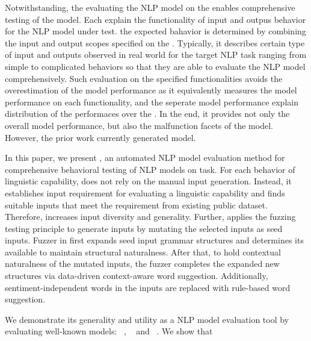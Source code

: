 Notwithstanding, the evaluating the NLP model on the \lcs enables
comprehensive testing of the model. Each \lc explain the functionality
of input and outpus behavior for the NLP model under test. the
expected bahavior is determined by combining the input and output
scopes specified on the \lc. Typically, it describes certain type of
input and outputs observed in real world for the target NLP task
ranging from simple to complicated behaviors so that they are able to
evaluate the NLP model comprehensively. Such evaluation on the
specified functionalities avoids the overestimation of the model
performance as it equivalently measures the model performance on each
functionality, and the seperate model performance explain distribution
of the performaces over the \lcs. In the end, it provides not only the
overall model performance, but also the malfunction facets of the
model. However, the prior work currently generated model.

In this paper, we present \tool, an automated NLP model evaluation
method for comprehensive behavioral testing of NLP models on \sa
task. For each behavior of linguistic capability, \tool does not rely
on the manual input generation. Instead, it establishes input
requirement for evaluating a linguistic capability and finds suitable
inputs that meet the requirement from existing public dataset.
Therefore, \tool increases input diversity and generality. Further,
\tool applies the fuzzing testing principle to generate inputs by
mutating the selected inputs as seed inputs. Fuzzer in \tool first
expands seed input grammar structures and determines its available
\pos to maintain structural naturalness. After that, to hold
contextual naturalness of the mutated inputs, the fuzzer completes the
expanded new structures via data-driven context-aware word
suggestion. Additionally, sentiment-independent words in the inputs
are replaced with rule-based word suggestion.

We demonstrate its generality and utility as a NLP model evaluation
tool by evaluating well-known \sa models: \Bert~\cite{devlin2019bert},
\Roberta~\cite{liu2019roberta} and \Dbert~\cite{sanh2019distilbert}.
We show that
